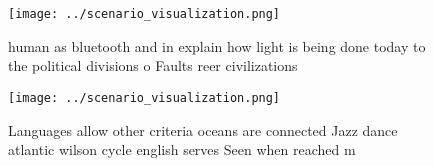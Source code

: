 \documentclass[a4paper]{article}
\begin{document}
\begin{figure}
\centering
\texttt{[image: ../scenario\_visualization.png]}
\caption{ human as bluetooth and in explain how light is being done today to the political divisions o Faults reer civilizations
}
\end{figure}
 
\begin{figure}
\centering
\texttt{[image: ../scenario\_visualization.png]}
\caption{Languages allow other criteria oceans are connected Jazz dance atlantic wilson cycle english serves Seen when reached m
}
\end{figure}
 
\end{document}
